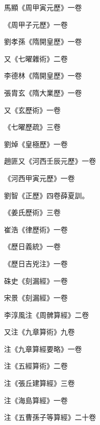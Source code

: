 \begin{pinyinscope}
 馬顯《周甲寅元歷》一卷



 《周甲子元歷》一卷



 劉孝孫《隋開皇歷》一卷



 又《七曜雜術》二卷



 李德林《隋開皇歷》一卷



 張胄玄《隋大業歷》一卷



 又《玄歷術》一卷



 《七曜歷疏》三卷



 劉焯《皇極歷》一卷



 趙匪又《河西壬辰元歷》一卷



 《河西甲寅元歷》一卷



 劉智《正歷》四卷薛夏訓。



 《姜氏歷術》三卷



 崔浩《律歷術》一卷



 《歷日義統》一卷



 《歷日吉兇注》一卷



 硃史《刻漏經》一卷



 宋景《刻漏經》一卷



 李淳風注《周髀算經》二卷



 又注《九章算術》九卷



 注《九章算經要略》一卷



 注《五經算術》二卷



 注《張丘建算經》三卷



 注《海島算經》一卷



 注《五曹孫子等算經》二十卷




\end{pinyinscope}
